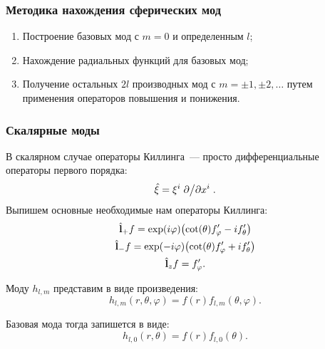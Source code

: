 \documentclass{beamer}
\begin{document}

    \begin{frame}\frametitle{Методика нахождения сферических мод}

        \begin{enumerate}
            \item Построение базовых мод с $m = 0$ и определенным $l$;
            \item Нахождение радиальных функций для базовых мод;
            \item Получение остальных $2l$ производных мод с $m = \pm 1, \pm 2, \dots$ путем применения операторов повышения и понижения.
        \end{enumerate}

    \end{frame}


    \begin{frame}\frametitle{Скалярные моды}

        В скалярном случае операторы Киллинга~--- просто дифференциальные операторы первого порядка:
        \begin{equation}
            \hat{\mathbf{\xi}} = \xi^i \pdv*{x^i} .
        \end{equation}
        Выпишем основные необходимые нам операторы Киллинга:
        \begin{equation}\begin{gathered}
            \hat{\mathbf{l}}_{+} f = \exp(i\varphi) \qty(\cot(\theta) f'_\varphi - i f'_\theta) \\
            \hat{\mathbf{l}}_{-} f = \exp(-i\varphi) \qty(\cot(\theta) f'_\varphi + i f'_\theta) \\
            \hat{\mathbf{l}}_z f   = f'_\varphi .
        \end{gathered}\end{equation}

        Моду $h_{l,m}$ представим в виде произведения:
        \begin{equation}
            h_{l,m}(r,\theta,\varphi) = f(r) f_{l,m}(\theta,\varphi) .
        \end{equation}

        Базовая мода тогда запишется в виде:
        \begin{equation}
            h_{l,0}(r,\theta) = f(r) f_{l,0}(\theta) .
        \end{equation}

    \end{frame}
\end{document}
